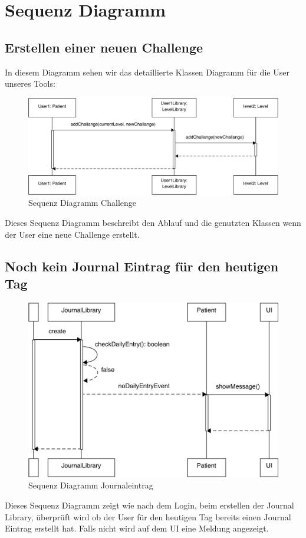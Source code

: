 \chapter{Sequenz Diagramm}
\section{Erstellen einer neuen Challenge}
In diesem Diagramm sehen wir das detaillierte Klassen Diagramm für die User unseres Tools:
\begin{figure}[H]
\centering
\includegraphics[width=1\textwidth]{../SequenzDiagramm/CreateChallangeCorrected.png}
\caption{Sequenz Diagramm Challenge}
\end{figure}
Dieses Sequenz Diagramm beschreibt den Ablauf und die genutzten Klassen wenn der User eine neue Challenge erstellt.

\section{Noch kein Journal Eintrag für den heutigen Tag}
\begin{figure}[H]
\centering
\includegraphics[width=1\textwidth]{../SequenzDiagramm/NoEntryCorrected.png}
\caption{Sequenz Diagramm Journaleintrag}
\end{figure}
Dieses Sequenz Diagramm zeigt wie nach dem Login, beim erstellen der Journal Library, überprüft wird ob der User für den heutigen Tag bereits einen Journal Eintrag erstellt hat. Falls nicht wird auf dem UI eine Meldung angezeigt.
